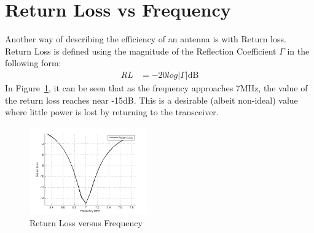 \section{Return Loss vs Frequency}

Another way of describing the efficiency of an antenna is with Return loss.
Return Loss is defined using the magnitude of the Reflection Coefficient $\Gamma$ in the following
form:
\begin{align}
  RL&=-20log|\Gamma|\text{dB}
\end{align}
In Figure~\ref{fig:rl}, it can be seen that as the frequency approaches 7MHz, the
value of the return loss reaches near -15dB. This is a desirable
(albeit non-ideal) value where little power is lost by returning to the
transceiver. 

\begin{figure}[h!]
  \centering
  \includegraphics[width=0.45\textwidth]{./img/retloss.png}
  \caption{Return Loss versus Frequency}
  \label{fig:rl}
\end{figure}
